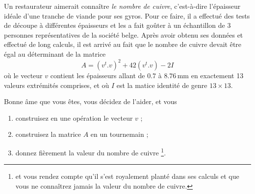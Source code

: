 \begin{exercice}\label{exoMatlab0028}

Un restaurateur aimerait connaître \emph{le nombre de cuivre}, c'est-à-dire l'épaisseur idéale d'une tranche de viande pour ses gyros. Pour ce faire, il a effectué des tests de découpe à différentes épaisseurs et les a fait goûter à un échantillon de 3 personnes représentatives de la société belge.
Après avoir obtenu ses données et effectué de long calculs, il est arrivé au fait que le nombre de cuivre devait être égal au déterminant de la matrice
\[ A= (v^t.v)^2 + 42(v^t.v) - 2I \]
où le vecteur $v$ contient les épaisseurs allant de $0.7$ à $8.76\,\text{mm}$ en exactement 13 valeurs extrémités comprises, et où $I$ est la matice identité de genre $13\times 13$.

Bonne âme que vous êtes, vous décidez de l'aider, et vous
\begin{enumerate}
\item construisez en une opération le vecteur $v$ ;
\item construisez la matrice $A$ en un tournemain ;
\item donnez fièrement la valeur du nombre de cuivre \footnote{et vous rendez compte qu'il s'est royalement planté dans ses calculs et que vous ne connaîtrez jamais la valeur du nombre de cuivre.}.
\end{enumerate}

\end{exercice}
